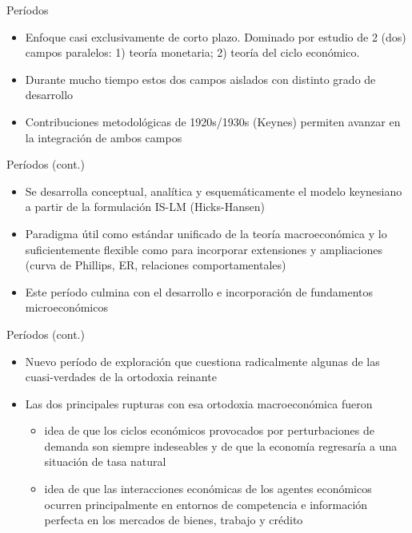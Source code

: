 \documentclass[
  ignorenonframetext,
]{beamer}
\providecommand{\tightlist}{%
  \setlength{\itemsep}{0pt}\setlength{\parskip}{0pt}}\usepackage{longtable,booktabs,array}
\begin{document}
\begin{frame}{Períodos}
\protect\hypertarget{peruxedodos}{}
\begin{itemize}
\tightlist
\item
  Enfoque casi exclusivamente de corto plazo. Dominado por estudio de 2
  (dos) campos paralelos: 1) teoría monetaria; 2) teoría del ciclo
  económico.
\item
  Durante mucho tiempo estos dos campos aislados con distinto grado de
  desarrollo
\item
  Contribuciones metodológicas de 1920s/1930s (Keynes) permiten avanzar
  en la integración de ambos campos
\end{itemize}
\end{frame}

\begin{frame}{Períodos (cont.)}
\protect\hypertarget{peruxedodos-cont.}{}
\begin{itemize}
\tightlist
\item
  Se desarrolla conceptual, analítica y esquemáticamente el modelo
  keynesiano a partir de la formulación IS-LM (Hicks-Hansen)
\item
  Paradigma útil como estándar unificado de la teoría macroeconómica y
  lo suficientemente flexible como para incorporar extensiones y
  ampliaciones (curva de Phillips, ER, relaciones comportamentales)
\item
  Este período culmina con el desarrollo e incorporación de fundamentos
  microeconómicos
\end{itemize}
\end{frame}

\begin{frame}{Períodos (cont.)}
\protect\hypertarget{peruxedodos-cont.-1}{}
\begin{itemize}
\tightlist
\item
  Nuevo período de exploración que cuestiona radicalmente algunas de las
  cuasi-verdades de la ortodoxia reinante
\item
  Las dos principales rupturas con esa ortodoxia macroeconómica fueron

  \begin{itemize}
  \tightlist
  \item
    idea de que los ciclos económicos provocados por perturbaciones de
    demanda son siempre indeseables y de que la economía regresaría a
    una situación de tasa natural
  \item
    idea de que las interacciones económicas de los agentes económicos
    ocurren principalmente en entornos de competencia e información
    perfecta en los mercados de bienes, trabajo y crédito
  \end{itemize}
\end{itemize}
\end{frame}
\end{document}
